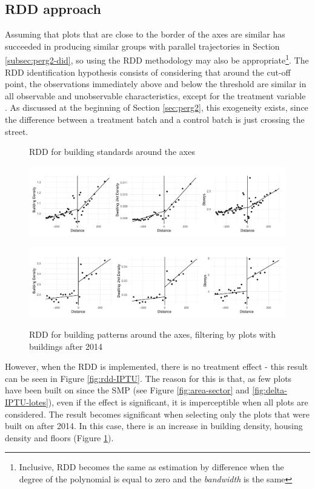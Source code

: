 \subsection{RDD approach}

Assuming that plots that are close to the border of the axes are similar has succeeded in producing similar groups with parallel trajectories in Section \ref{subsec:perg2-did}, so using the RDD methodology may also be appropriate\footnote{Inclusive, RDD becomes the same as estimation by difference when the degree of the polynomial is equal to zero and the \textit{bandwidth} is the same}. The RDD identification hypothesis consists of considering that around the cut-off point, the observations immediately above and below the threshold are similar in all observable and unobservable characteristics, except for the treatment variable \cite{Cattaneo2019, Cattaneo2024}. As discussed at the beginning of Section \ref{sec:perg2}, this exogeneity exists, since the difference between a treatment batch and a control batch is just crossing the street.

\begin{figure}[!h]
    \centering

    \caption{RDD for building standards around the axes}
    \includegraphics[width = .99\textwidth]{figuras/rdd-plot-IPTU.pdf}
    \label{fig:rdd-IPTU}

    \caption{RDD for building patterns around the axes, filtering by plots with buildings after 2014}
    \includegraphics[width = .99\textwidth]{figuras/rdd-plot-IPTU-posPDE.pdf}
    \label{fig:rdd-IPTU-posSMP}
\end{figure}

However, when the RDD is implemented, there is no treatment effect - this result can be seen in Figure \ref{fig:rdd-IPTU}. The reason for this is that, as few plots have been built on since the SMP (see Figure \ref{fig:area-sector} and \ref{fig:delta-IPTU-lotes}), even if the effect is significant, it is imperceptible when all plots are considered. The result becomes significant when selecting only the plots that were built on after 2014. In this case, there is an increase in building density, housing density and floors (Figure \ref{fig:rdd-IPTU-posSMP}).

